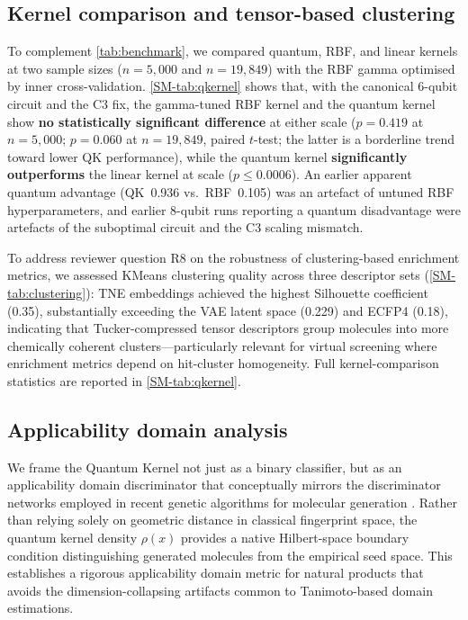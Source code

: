 \documentclass[11pt,a4paper]{article}
\begin{document}
\subsection{Kernel comparison and tensor-based clustering}\label{sec:tensor_clustering}

To complement \cref{tab:benchmark}, we compared quantum, RBF, and linear kernels at two sample sizes ($n = 5{,}000$ and $n = 19{,}849$) with the RBF gamma optimised by inner cross-validation. \cref{SM-tab:qkernel} shows that, with the canonical 6-qubit circuit and the C3 fix, the gamma-tuned RBF kernel and the quantum kernel show \textbf{no statistically significant difference} at either scale ($p = 0.419$ at $n = 5{,}000$; $p = 0.060$ at $n = 19{,}849$, paired $t$-test; the latter is a borderline trend toward lower QK performance), while the quantum kernel \textbf{significantly outperforms} the linear kernel at scale ($p \leq 0.0006$). An earlier apparent quantum advantage (QK~0.936 vs.~RBF~0.105) was an artefact of untuned RBF hyperparameters, and earlier 8-qubit runs reporting a quantum disadvantage were artefacts of the suboptimal circuit and the C3 scaling mismatch.

To address reviewer question R8 on the robustness of clustering-based enrichment metrics, we assessed KMeans clustering quality across three descriptor sets (\cref{SM-tab:clustering}): TNE embeddings achieved the highest Silhouette coefficient (\num{0.35}), substantially exceeding the VAE latent space (\num{0.229}) and ECFP4 (\num{0.18}), indicating that Tucker-compressed tensor descriptors group molecules into more chemically coherent clusters---particularly relevant for virtual screening where enrichment metrics depend on hit-cluster homogeneity. Full kernel-comparison statistics are reported in \cref{SM-tab:qkernel}.

\subsection{Applicability domain analysis}\label{sec:applicability_domain}

We frame the Quantum Kernel not just as a binary classifier, but as an applicability domain discriminator that conceptually mirrors the discriminator networks employed in recent genetic algorithms for molecular generation \citep{jensen2019augmenting}. Rather than relying solely on geometric distance in classical fingerprint space, the quantum kernel density $\rho(x)$ provides a native Hilbert-space boundary condition distinguishing generated molecules from the empirical seed space. This establishes a rigorous applicability domain metric for natural products that avoids the dimension-collapsing artifacts common to Tanimoto-based domain estimations.
\end{document}
